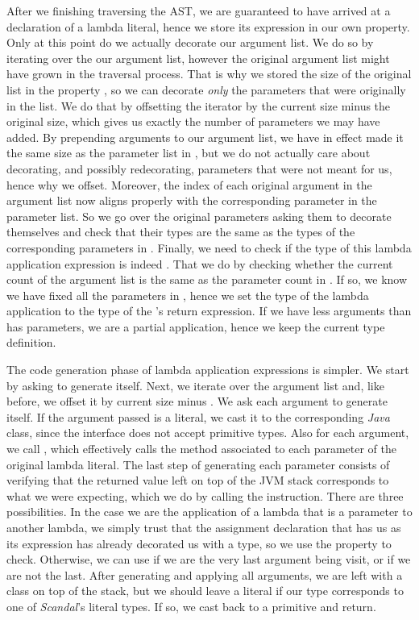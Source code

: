 After we finishing traversing the AST, we are guaranteed to have arrived at a declaration of a lambda literal, hence we store its expression in our own  property. Only at this point do we actually decorate our argument list. We do so by iterating over the our argument list, however the original argument list might have grown in the traversal process. That is why we stored the size of the original list in the property , so we can decorate \emph{only} the parameters that were originally in the list. We do that by offsetting the iterator by the current size minus the original size, which gives us exactly the number of parameters we may have added. By prepending arguments to our argument list, we have in effect made it the same size as the parameter list in , but we do not actually care about decorating, and possibly redecorating, parameters that were not meant for us, hence why we offset. Moreover, the index of each original argument in the argument list now aligns properly with the corresponding parameter in the  parameter list. So we go over the original parameters asking them to decorate themselves and check that their types are the same as the types of the corresponding parameters in . Finally, we need to check if the type of this lambda application expression is indeed . That we do by checking whether the current count of the argument list is the same as the parameter count in . If so, we know we have fixed all the parameters in , hence we set the type of the lambda application to the type of the 's return expression. If we have less arguments than  has parameters, we are a partial application, hence we keep the current type definition.

The code generation phase of lambda application expressions is simpler. We start by asking  to generate itself. Next, we iterate over the argument list and, like before, we offset it by current size minus . We ask each argument to generate itself. If the argument passed is a literal, we cast it to the corresponding \emph{Java} class, since the  interface does not accept primitive types. Also for each argument, we call , which effectively calls the method associated to each parameter of the original lambda literal. The last step of generating each parameter consists of verifying that the returned value left on top of the JVM stack corresponds to what we were expecting, which we do by calling the  instruction. There are three possibilities. In the case we are the application of a lambda that is a parameter to another lambda, we simply trust that the assignment declaration that has us as its expression has already decorated us with a type, so we use the  property to check. Otherwise, we can use  if we are the very last argument being visit, or  if we are not the last. After generating and applying all arguments, we are left with a  class on top of the stack, but we should leave a literal if our type corresponds to one of \emph{Scandal}'s literal types. If so, we cast back to a primitive and return.

